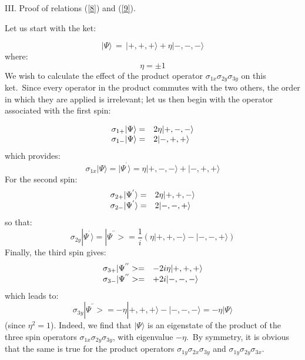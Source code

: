 \documentclass[12pt,onecolumn]{article}%
\begin{document}
\bigskip

\begin{center}
III. Proof of relations (\ref{8}) and (\ref{9}).
\end{center}

Let us start with the ket:%

\begin{equation}
|\Psi\rangle \,=\,|+,+,+\rangle +\eta|-,-,-\rangle  \label{a1}%
\end{equation}
where:
\begin{equation}
\eta=\pm1 \label{a2}%
\end{equation}
We wish to calculate the effect of the product operator $\sigma_{1x}%
\sigma_{2y}\sigma_{3y}$ on this ket.\ Since every operator in the product
commutes with the two others, the order in which they are applied is
irrelevant; let us then begin with the operator associated with the first spin:%

\begin{equation}%
\begin{array}
[c]{ll}%
\sigma_{1+}|\Psi\rangle = & 2\eta|+,-,-\rangle \\
\sigma_{1-}|\Psi\rangle = & 2|-,+,+\rangle 
\end{array}
\label{a3}%
\end{equation}
which provides:
\begin{equation}
\sigma_{1x}|\Psi\rangle =|\Psi^{^{\prime}}\rangle =\eta|+,-,-\rangle +|-,+,+\rangle 
\label{a4}%
\end{equation}
For the second spin:
\begin{equation}%
\begin{array}
[c]{ll}%
\sigma_{2+}|\Psi^{^{\prime}}\rangle = & 2\eta|+,+,-\rangle \\
\sigma_{2-}|\Psi^{^{\prime}}\rangle = & 2|-,-,+\rangle 
\end{array}
\label{a5}%
\end{equation}
so that:
\begin{equation}
\sigma_{2y}|\Psi^{^{\prime}}\rangle =|\Psi^{^{\prime\prime}}>=\frac{1}%
{i}\left(  \eta|+,+,-\rangle -|-,-,+\rangle \right)  \label{a6}%
\end{equation}
Finally, the third spin gives:
\begin{equation}%
\begin{array}
[c]{ll}%
\sigma_{3+}|\Psi^{^{\prime\prime}}>= & -2i\eta|+,+,+\rangle \\
\sigma_{3-}|\Psi^{^{\prime\prime}}>= & +2i|-,-,-\rangle 
\end{array}
\label{a7}%
\end{equation}
which leads to:
\begin{equation}
\sigma_{3y}|\Psi^{^{\prime\prime}}>=-\eta|+,+,+\rangle -|-,-,-\rangle =-\eta
|\Psi\rangle  \label{a8}%
\end{equation}
(since $\eta^{2}=1$). Indeed, we find that $|\Psi\rangle $ is an eigenstate of the
product of the three spin operators $\sigma_{1x}\sigma_{2y}\sigma_{3y}$, with
eigenvalue $-\eta$.\ By symmetry, it is obvious that the same is true for the
product operators $\sigma_{1y}\sigma_{2x}\sigma_{3y}$ and $\sigma_{1y}%
\sigma_{2y}\sigma_{3x}$.
\end{document}
